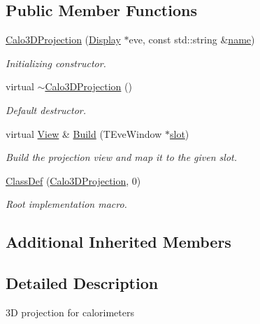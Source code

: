 \subsection*{Public Member Functions}
\begin{DoxyCompactItemize}
\item 
\hyperlink{class_d_d4hep_1_1_calo3_d_projection_a919a663da0171fe6025081f6daa5cf23}{Calo3\+D\+Projection} (\hyperlink{class_d_d4hep_1_1_display}{Display} $\ast$eve, const std\+::string \&\hyperlink{class_d_d4hep_1_1_view_ae369eadf16399a6bf34f1ce491b7a788}{name})
\begin{DoxyCompactList}\small\item\em Initializing constructor. \end{DoxyCompactList}\item 
virtual \hyperlink{class_d_d4hep_1_1_calo3_d_projection_a21d41d0b38ff49b6e51f7d780a82351c}{$\sim$\+Calo3\+D\+Projection} ()
\begin{DoxyCompactList}\small\item\em Default destructor. \end{DoxyCompactList}\item 
virtual \hyperlink{class_d_d4hep_1_1_view}{View} \& \hyperlink{class_d_d4hep_1_1_calo3_d_projection_a2f0865f08b8eedfc84323b8a280d1216}{Build} (T\+Eve\+Window $\ast$\hyperlink{_multi_view_8cpp_a402e7b855ac7bcf09e2ecf5e98220a11}{slot})
\begin{DoxyCompactList}\small\item\em Build the projection view and map it to the given slot. \end{DoxyCompactList}\item 
\hyperlink{class_d_d4hep_1_1_calo3_d_projection_a4696a6c764ceaf1307e6459c24cd7d1f}{Class\+Def} (\hyperlink{class_d_d4hep_1_1_calo3_d_projection}{Calo3\+D\+Projection}, 0)
\begin{DoxyCompactList}\small\item\em Root implementation macro. \end{DoxyCompactList}\end{DoxyCompactItemize}
\subsection*{Additional Inherited Members}


\subsection{Detailed Description}
3D projection for calorimeters 

